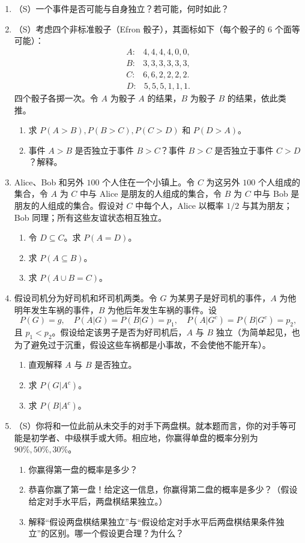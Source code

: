 \documentclass[UTF8, 12pt, fontset=fandol, oneside]{ctexart}
\begin{document}
\begin{enumerate}
  \item （S）一个事件是否可能与自身独立？若可能，何时如此？

  \item （S）考虑四个非标准骰子（Efron 骰子），其面标如下（每个骰子的 $6$ 个面等可能）：
  \[
  \begin{array}{ll}
    A: & 4,4,4,4,0,0,\\
    B: & 3,3,3,3,3,3,\\
    C: & 6,6,2,2,2,2.
  \end{array}
  \]
  \[
  \begin{array}{ll}
    D: & 5,5,5,1,1,1.
  \end{array}
  \]
  四个骰子各掷一次。令 $A$ 为骰子 $A$ 的结果，$B$ 为骰子 $B$ 的结果，依此类推。
  \begin{enumerate}
    \item 求 $P(A>B),P(B>C),P(C>D)$ 和 $P(D>A)$。
    \item 事件 $A>B$ 是否独立于事件 $B>C$？事件 $B>C$ 是否独立于事件 $C>D$？解释。
  \end{enumerate}

  \item Alice、Bob 和另外 $100$ 个人住在一个小镇上。令 $C$ 为这另外 $100$ 个人组成的集合，令 $A$ 为 $C$ 中与 Alice 是朋友的人组成的集合，令 $B$ 为 $C$ 中与 Bob 是朋友的人组成的集合。假设对 $C$ 中每个人，Alice 以概率 $1/2$ 与其为朋友；Bob 同理；所有这些友谊状态相互独立。
  \begin{enumerate}
    \item 令 $D\subseteq C$。求 $P(A=D)$。
    \item 求 $P(A\subseteq B)$。
    \item 求 $P(A\cup B=C)$。
  \end{enumerate}

  \item 假设司机分为好司机和坏司机两类。令 $G$ 为某男子是好司机的事件，$A$ 为他明年发生车祸的事件，$B$ 为他后年发生车祸的事件。设
  \[
    P(G)=g,\quad P(A|G)=P(B|G)=p_1,\quad
    P(A|G^c)=P(B|G^c)=p_2,
  \]
  且 $p_1<p_2$。假设给定该男子是否为好司机后，$A$ 与 $B$ 独立（为简单起见，也为了避免过于沉重，假设这些车祸都是小事故，不会使他不能开车）。
  \begin{enumerate}
    \item 直观解释 $A$ 与 $B$ 是否独立。
    \item 求 $P(G|A^c)$。
    \item 求 $P(B|A^c)$。
  \end{enumerate}

  \item （S）你将和一位此前从未交手的对手下两盘棋。就本题而言，你的对手等可能是初学者、中级棋手或大师。相应地，你赢得单盘的概率分别为 $90\%,50\%,30\%$。
  \begin{enumerate}
    \item 你赢得第一盘的概率是多少？
    \item 恭喜你赢了第一盘！给定这一信息，你赢得第二盘的概率是多少？（假设给定对手水平后，两盘棋结果独立。）
    \item 解释“假设两盘棋结果独立”与“假设给定对手水平后两盘棋结果条件独立”的区别。哪一个假设更合理？为什么？
  \end{enumerate}


\end{enumerate}
\end{document}
